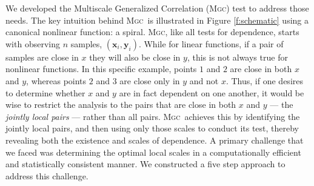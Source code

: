 \documentclass[11pt]{article}
\providecommand{\sct}[1]{{\normalfont\textsc{#1}}}
\providecommand{\mb}[1]{\boldsymbol{#1}}
\newcommand{\Mgc}{\sct{Mgc}}
\newcommand{\mbx}{\ensuremath{\mb{x}}}
\newcommand{\mby}{\ensuremath{\mb{y}}}
\begin{document}
We developed the Multiscale Generalized Correlation (\Mgc) test to address those needs.
The key intuition behind  \Mgc~is illustrated in Figure \ref{f:schematic} using a canonical nonlinear  function: a spiral.  
\Mgc, like all tests for dependence, starts with observing $n$ samples, $(\mbx_i,\mby_i)$. 
While for linear functions, if a pair of samples are close in $x$ they will also be close in $y$, this is not always true for nonlinear functions.
In this specific example, points $1$ and $2$ are close in both $x$ and $y$, whereas points $2$ and $3$ are close only in $y$ and not $x$.
Thus, if one desires to determine whether $x$ and $y$ are in fact dependent on one another, it would be wise to restrict the analysis to the pairs that are close in both $x$ and $y$ --- the \emph{jointly local pairs} --- rather than all pairs.  
\Mgc~achieves this by identifying the jointly local pairs, 
and then using only those scales to conduct its test, thereby revealing both the existence and scales of dependence.
%
%
A primary challenge that we faced was determining the optimal local scales in a computationally efficient and statistically consistent manner. We constructed a five step approach to address this challenge. 

\end{document}
